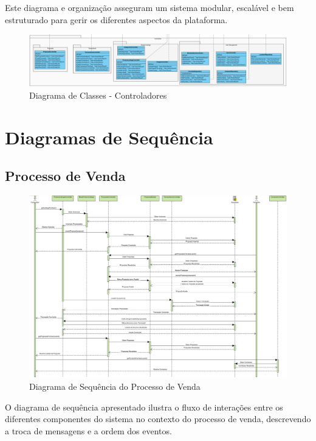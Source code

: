 \documentclass[a4paper, 12pt]{article} %
\begin{document}
Este diagrama e organização asseguram um sistema modular, escalável e bem estruturado para gerir os diferentes aspectos da plataforma.

\begin{figure}[ht]
	\centering
	\includegraphics[width=\textwidth]{../images/class-diagram-controllers.png}
	\caption{Diagrama de Classes - Controladores}
	\label{fig:class_diagram_controllers}
\end{figure}

\newpage
\section*{Diagramas de Sequência}

\subsection{Processo de Venda}
\begin{figure}[ht]
	\centering
	\includegraphics[width=\textwidth]{../images/sequence-diagram-sale.png}
	\caption{Diagrama de Sequência do Processo de Venda}
	\label{fig:diagrama_sequencia_venda}
\end{figure}

O diagrama de sequência apresentado ilustra o fluxo de interações entre os diferentes componentes do sistema no contexto do processo de venda, descrevendo a troca de mensagens e a ordem dos eventos.
\end{document}
